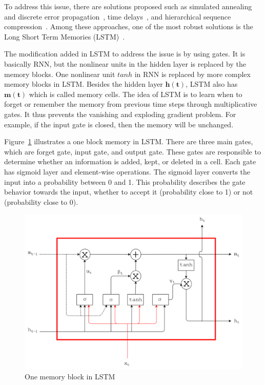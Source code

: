To address this issue, there are solutions proposed such as simulated annealing and discrete error propagation~\citep{bengio1994learning}, time delays~\citep{lang1990time}, and hierarchical sequence compression~\citep{schmidhuber2007training}. Among these approaches, one of the most robust solutions is the Long Short Term Memories (LSTM)~\citep{hochreiter1997long}. 

The modification added in LSTM to address the issue is by using gates. It is basically RNN, but the nonlinear units in the hidden layer is replaced by the memory blocks. One nonlinear unit $tanh$ in RNN is replaced by more complex memory blocks in LSTM. Besides the hidden layer $\mathbf{h(t)}$, LSTM also has $\mathbf{m(t)}$ which is called memory cells.  The idea of LSTM is to learn when to forget or remember the memory from previous time steps through multiplicative gates. It thus prevents the vanishing and exploding gradient problem. For example, if the input gate is closed, then the memory will be unchanged.

Figure~\ref{fig:lstm} illustrates a one block memory in LSTM. There are three main gates, which are forget gate, input gate, and output gate. These gates are responsible to determine whether an information is added, kept, or deleted in a cell. Each gate has sigmoid layer and element-wise operations. The sigmoid layer converts the input into a probability between 0 and 1. This probability describes the gate behavior towards the input, whether to accept it (probability close to 1) or not (probability close to 0). 

\begin{figure}
	\centering
	\includegraphics[width=1.0\linewidth]{images/lstm}
	\caption{One memory block in LSTM~\citep{skripsiwahid}}
	\label{fig:lstm}
\end{figure}

